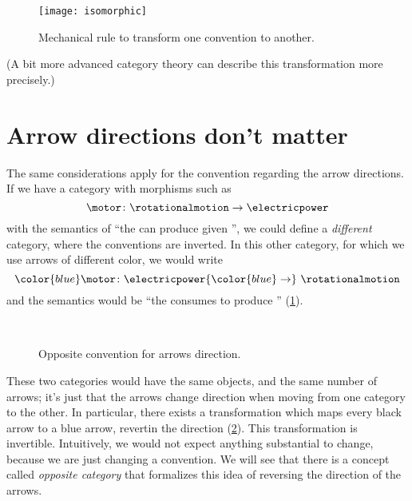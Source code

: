 \begin{figure}[h]
    \texttt{[image: isomorphic]}
    \caption{Mechanical rule to transform one convention to another.}
\end{figure}

(A bit more advanced category theory can describe this transformation more precisely.)

\section{Arrow directions don't matter}
The same considerations apply for the convention regarding the arrow directions.
If we have a category with morphisms such as
\begin{equation*}
	\motor \colon \rotationalmotion \to \electricpower
\end{equation*}
with the semantics of ``the \motor can produce \rotationalmotion given \electricpower'', we could define a \emph{different} category, where the conventions are inverted.
In this other category, for which we use arrows of different color, we would write
\begin{equation*}
	{\color{blue}\motor}
	\colon \electricpower {\color{blue} \to}\  \rotationalmotion
\end{equation*}
and the semantics would be ``the \motor consumes \electricpower to produce \rotationalmotion'' (\cref{fig:inverted}).

\begin{figure}[h!]
	\centering
	\\[+15pt]
	\caption{Opposite convention for arrows direction. }
	\label{fig:inverted}
\end{figure}

These two categories would have the same objects, and the same number of arrows; it's just that the arrows change direction when moving from one category to the other.
In particular, there exists a transformation which maps every black arrow to a blue arrow, revertin the direction (\cref{fig:inverted_2}).
This transformation is invertible.
Intuitively, we would not expect anything substantial to change, because we are just changing a convention.
We will see that there is a concept called \emph{opposite category} that formalizes this idea of reversing the direction of the arrows.

\begin{figure}[h!]
	\centering
	\caption{}
	\label{fig:inverted_2}
\end{figure}

